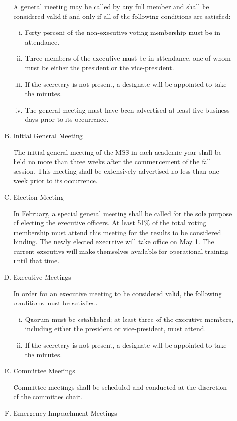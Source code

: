 \documentclass[11pt]{article}
\begin{document}
\begin{enumerate}[I.]
\begin{enumerate}[A)]
			A general meeting may be called by any full member and shall be considered valid if and only if all of the following conditions are satisfied:
				\begin{enumerate}[i)]
					\item Forty percent of the non-executive voting membership must be in attendance. 
					\item Three members of the executive must be in attendance, one of whom must be either the president or the vice-president.
					\item If the secretary is not present, a designate will be appointed to take the minutes. 
					\item The general meeting must have been advertised at least five business days prior to its occurrence.
				\end{enumerate}
			\item Initial General Meeting
			
			The initial general meeting of the MSS in each academic year shall be held no more than three weeks after the commencement of the fall session. This meeting shall be extensively advertised no less than one week prior to its occurrence. 
			\item Election Meeting
			
			In February, a special general meeting shall be called for the sole purpose of electing the executive officers. At least 51\% of the total voting membership must attend this meeting for the results to be considered binding. The newly elected executive will take office on May 1. The current executive will make themselves available for operational training until that time. 
			\item Executive Meetings
			
			In order for an executive meeting to be considered valid, the following conditions must be satisfied.
				\begin{enumerate}[i)]
					\item Quorum must be established; at least three of the executive members, including either the president or vice-president, must attend. 
					\item  If the secretary is not present, a designate will be appointed to take the minutes. 
				\end{enumerate}
			\item Committee Meetings
			
			Committee meetings shall be scheduled and conducted at the discretion of the committee chair.
			\item Emergency Impeachment Meetings
			

\end{enumerate}
\end{enumerate}
\end{document}
